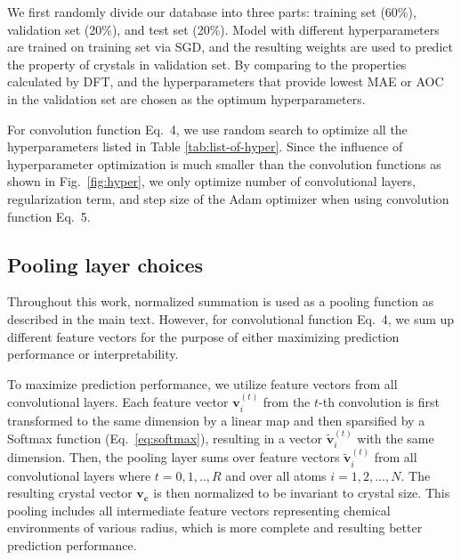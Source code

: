 \documentclass[twocolumn, prl]{revtex4-1}
\begin{document}
We first randomly divide our database into three parts: training set (60\%), validation set (20\%), and test set (20\%). Model with different hyperparameters are trained on training set via SGD, and the resulting weights are used to predict the property of crystals in validation set. By comparing to the properties calculated by DFT, and the hyperparameters that provide lowest MAE or AOC in the validation set are chosen as the optimum hyperparameters.

For convolution function Eq.~4, we use random search to optimize all the hyperparameters listed in Table \ref{tab:list-of-hyper}. Since the influence of hyperparameter optimization is much smaller than the convolution functions as shown in Fig.~\ref{fig:hyper}, we only optimize number of convolutional layers, regularization term, and step size of the Adam optimizer when using convolution function Eq.~5.

\subsection{Pooling layer choices}
Throughout this work, normalized summation is used as a pooling function as described in the main text. However, for convolutional function Eq.~4, we sum up different feature vectors for the purpose of either maximizing prediction performance or interpretability.

To maximize prediction performance, we utilize feature vectors from all convolutional layers. Each feature vector $\bm{v}_i^{(t)}$ from the $t$-th convolution is first transformed to the same dimension by a linear map and then sparsified by a Softmax function (Eq.~\ref{eq:softmax}), resulting in a vector $\bm{\tilde{v}}_i^{(t)}$ with the same dimension. Then, the pooling layer sums over feature vectors $\bm{\tilde{v}}_i^{(t)}$ from all convolutional layers where $t=0, 1, .., R$ and over all atoms $i = 1, 2, ..., N$. The resulting crystal vector $\bm{v_c}$ is then normalized to be invariant to crystal size. This pooling includes all intermediate feature vectors representing chemical environments of various radius, which is more complete and resulting better prediction performance.

\end{document}
